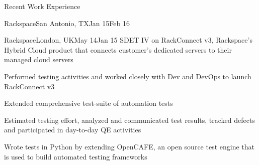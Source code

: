 \documentclass{resume} %
\begin{document}
\begin{rSection}{Recent Work Experience}
\begin{rSubsection}{Rackspace}{San Antonio, TX}{Jan 15}{Feb 16}
\end{rSubsection}


\begin{rSubsection}{Rackspace}{London, UK}{May 14}{Jan 15}
{SDET IV on RackConnect v3, Rackspace's Hybrid Cloud product that connects customer's dedicated servers to their managed cloud servers}

\item Performed testing activities and worked closely with Dev and DevOps to launch RackConnect v3
\item Extended comprehensive test-suite of automation tests
\item Estimated testing effort, analyzed and communicated test results, tracked defects and participated in day-to-day QE activities
\item Wrote tests in Python by extending OpenCAFE, an open source test engine that is used to build automated testing frameworks
\end{rSubsection}
\end{rSection}

\end{document}
